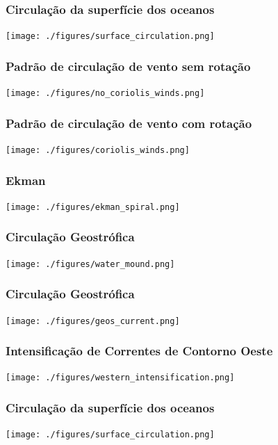 \begin{frame}
  \frametitle{Circulação da superfície dos oceanos}
  \begin{center}
    \texttt{[image: ./figures/surface\_circulation.png]}
  \end{center}
\end{frame}

\begin{frame}
  \frametitle{Padrão de circulação de vento {\bf sem} rotação}
  \begin{center}
    \texttt{[image: ./figures/no\_coriolis\_winds.png]}
  \end{center}
\end{frame}


\begin{frame}
  \frametitle{Padrão de circulação de vento {\bf com} rotação}
  \begin{center}
    \texttt{[image: ./figures/coriolis\_winds.png]}
  \end{center}
\end{frame}


\begin{frame}
  \frametitle{Ekman}
  \begin{center}
    \texttt{[image: ./figures/ekman\_spiral.png]}
  \end{center}
\end{frame}


\begin{frame}
  \frametitle{Circulação Geostrófica}
  \begin{center}
    \texttt{[image: ./figures/water\_mound.png]}
  \end{center}
\end{frame}


\begin{frame}
  \frametitle{Circulação Geostrófica}
  \begin{center}
    \texttt{[image: ./figures/geos\_current.png]}
  \end{center}
\end{frame}


\begin{frame}
  \frametitle{Intensificação de Correntes de Contorno Oeste}
  \begin{center}
    \texttt{[image: ./figures/western\_intensification.png]}
  \end{center}
\end{frame}


\begin{frame}
  \frametitle{Circulação da superfície dos oceanos}
  \begin{center}
    \texttt{[image: ./figures/surface\_circulation.png]}
  \end{center}
\end{frame}



